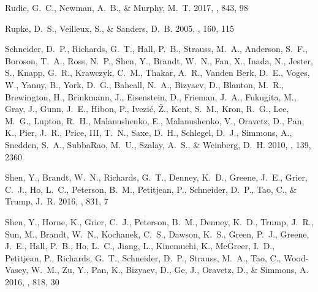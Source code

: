 \documentclass[iop]{emulateapj}
\begin{document}
{\begin{thebibliography}{52}
{Rudie}, G.~C., {Newman}, A.~B., \& {Murphy}, M.~T. 2017, \apj, 843, 98

{Rupke}, D.~S., {Veilleux}, S., \& {Sanders}, D.~B. 2005, \apjs, 160, 115

{Schneider}, D.~P., {Richards}, G.~T., {Hall}, P.~B., {Strauss}, M.~A.,
  {Anderson}, S.~F., {Boroson}, T.~A., {Ross}, N.~P., {Shen}, Y., {Brandt},
  W.~N., {Fan}, X., {Inada}, N., {Jester}, S., {Knapp}, G.~R., {Krawczyk},
  C.~M., {Thakar}, A.~R., {Vanden Berk}, D.~E., {Voges}, W., {Yanny}, B.,
  {York}, D.~G., {Bahcall}, N.~A., {Bizyaev}, D., {Blanton}, M.~R.,
  {Brewington}, H., {Brinkmann}, J., {Eisenstein}, D., {Frieman}, J.~A.,
  {Fukugita}, M., {Gray}, J., {Gunn}, J.~E., {Hibon}, P., {Ivezi{\'c}}, {\v
  Z}., {Kent}, S.~M., {Kron}, R.~G., {Lee}, M.~G., {Lupton}, R.~H.,
  {Malanushenko}, E., {Malanushenko}, V., {Oravetz}, D., {Pan}, K., {Pier},
  J.~R., {Price}, III, T.~N., {Saxe}, D.~H., {Schlegel}, D.~J., {Simmons}, A.,
  {Snedden}, S.~A., {SubbaRao}, M.~U., {Szalay}, A.~S., \& {Weinberg}, D.~H.
  2010, \aj, 139, 2360

{Shen}, Y., {Brandt}, W.~N., {Richards}, G.~T., {Denney}, K.~D., {Greene},
  J.~E., {Grier}, C.~J., {Ho}, L.~C., {Peterson}, B.~M., {Petitjean}, P.,
  {Schneider}, D.~P., {Tao}, C., \& {Trump}, J.~R. 2016{}, \apj,
  831, 7

{Shen}, Y., {Horne}, K., {Grier}, C.~J., {Peterson}, B.~M., {Denney}, K.~D.,
  {Trump}, J.~R., {Sun}, M., {Brandt}, W.~N., {Kochanek}, C.~S., {Dawson},
  K.~S., {Green}, P.~J., {Greene}, J.~E., {Hall}, P.~B., {Ho}, L.~C., {Jiang},
  L., {Kinemuchi}, K., {McGreer}, I.~D., {Petitjean}, P., {Richards}, G.~T.,
  {Schneider}, D.~P., {Strauss}, M.~A., {Tao}, C., {Wood-Vasey}, W.~M., {Zu},
  Y., {Pan}, K., {Bizyaev}, D., {Ge}, J., {Oravetz}, D., \& {Simmons}, A.
  2016{}, \apj, 818, 30


\end{thebibliography}}
\end{document}
